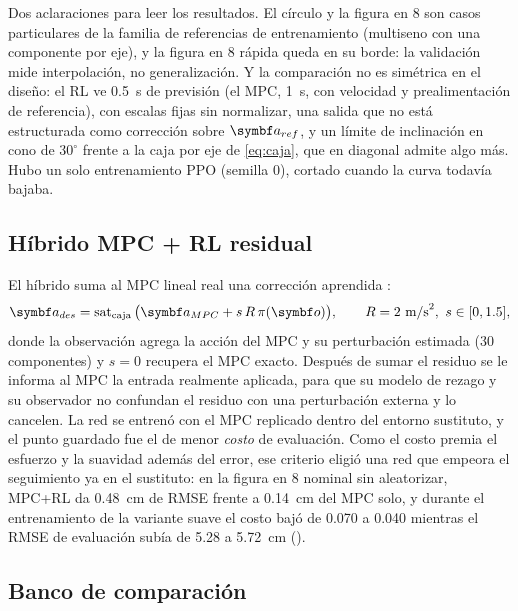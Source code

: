 Dos aclaraciones para leer los resultados. El círculo y la figura en 8 son
casos particulares de la familia de referencias de entrenamiento (multiseno
con una componente por eje), y la figura en 8 rápida queda en su borde: la
validación mide interpolación, no generalización. Y la comparación no es
simétrica en el diseño: el RL ve 0.5~s de previsión (el MPC, 1~s, con
velocidad y prealimentación de referencia), con escalas fijas sin
normalizar, una salida que no está estructurada como corrección sobre
$\vect a_{ref}$, y un límite de inclinación en cono de $30^\circ$ frente a la
caja por eje de \eqref{eq:caja}, que en diagonal admite algo más. Hubo un
solo entrenamiento PPO (semilla 0), cortado cuando la curva todavía bajaba.

\subsection{Híbrido MPC + RL residual}

El híbrido suma al MPC lineal real una corrección aprendida
\cite{johannink19,silver18}:
\begin{equation}
\vect a_{des}=\sat_{\text{caja}}\big(\vect a_{MPC}+s\,R\,\pi(\vect o)\big),\qquad R=2~\text{m/s}^2,\ s\in[0,1.5],
\label{eq:residual}
\end{equation}
donde la observación agrega la acción del MPC y su perturbación estimada
(30 componentes) y $s=0$ recupera el MPC exacto. Después de sumar el
residuo se le informa al MPC la entrada realmente aplicada, para que su
modelo de rezago y su observador no confundan el residuo con una
perturbación externa y lo cancelen. La red se entrenó con el MPC replicado
dentro del entorno sustituto, y el punto guardado fue el de menor
\emph{costo} de evaluación. Como el costo premia el esfuerzo y la suavidad
además del error, ese criterio eligió una red que empeora el seguimiento ya
en el sustituto: en la figura en 8 nominal sin aleatorizar, MPC+RL da
0.48~cm de RMSE frente a 0.14~cm del MPC solo, y durante el entrenamiento
de la variante suave el costo bajó de 0.070 a 0.040 mientras el RMSE de
evaluación subía de 5.28 a 5.72~cm ().

\subsection{Banco de comparación}
\label{sec:banco}

